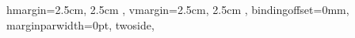 {{                  %
   hmargin={2.5cm, 2.5cm },     %
   vmargin={2.5cm, 2.5cm },     %
   bindingoffset=0mm,  %
   marginparwidth=0pt, %
   twoside,
}
} %


